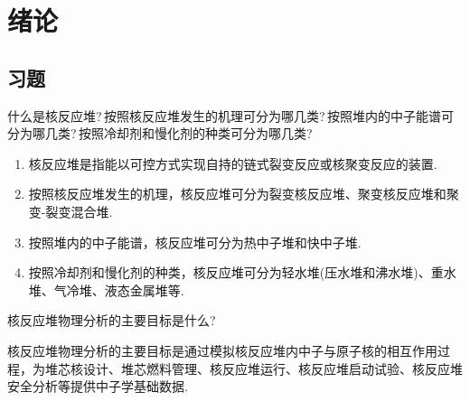 \chapter{绪论}

\section*{习题}

\begin{exercise}
    什么是核反应堆?\,按照核反应堆发生的机理可分为哪几类?\,按照堆内的中子能谱可分为哪几类?\,按照冷却剂和慢化剂的种类可分为哪几类?\,
    \begin{solution}
        \begin{enumerate}[(1)]
            \item 核反应堆是指能以可控方式实现自持的链式裂变反应或核聚变反应的装置.
            \item 按照核反应堆发生的机理，核反应堆可分为裂变核反应堆、聚变核反应堆和聚变-裂变混合堆.
            \item 按照堆内的中子能谱，核反应堆可分为热中子堆和快中子堆.
            \item 按照冷却剂和慢化剂的种类，核反应堆可分为轻水堆(压水堆和沸水堆)、重水堆、气冷堆、液态金属堆等.
        \end{enumerate}
    \end{solution}
\end{exercise}

\begin{exercise}
    核反应堆物理分析的主要目标是什么?\,
    \begin{solution}
        核反应堆物理分析的主要目标是通过模拟核反应堆内中子与原子核的相互作用过程，为堆芯核设计、堆芯燃料管理、核反应堆运行、核反应堆启动试验、核反应堆安全分析等提供中子学基础数据.
    \end{solution}
\end{exercise}